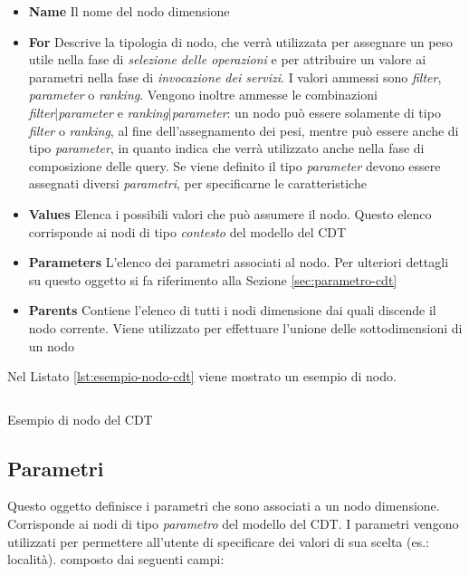 \begin{itemize}
	\item \textbf{Name} Il nome del nodo dimensione
	\item \textbf{For} Descrive la tipologia di nodo, che verrà utilizzata per assegnare un peso utile nella fase di \emph{selezione delle operazioni} e per attribuire un valore ai parametri nella fase di \emph{invocazione dei servizi}. I valori ammessi sono \emph{filter}, \emph{parameter} o \emph{ranking}. Vengono inoltre ammesse le combinazioni \emph{filter}|\emph{parameter} e \emph{ranking}|\emph{parameter}: un nodo può essere solamente di tipo \emph{filter} o \emph{ranking}, al fine dell'assegnamento dei pesi, mentre può essere anche di tipo \emph{parameter}, in quanto indica che verrà utilizzato anche nella fase di composizione delle query. Se viene definito il tipo \emph{parameter} devono essere assegnati diversi \emph{parametri}, per specificarne le caratteristiche
	\item \textbf{Values} Elenca i possibili valori che può assumere il nodo. Questo elenco corrisponde ai nodi di tipo \emph{contesto} del modello del CDT
	\item \textbf{Parameters} L'elenco dei parametri associati al nodo. Per ulteriori dettagli su questo oggetto si fa riferimento alla Sezione \ref{sec:parametro-cdt}
	\item \textbf{Parents} Contiene l'elenco di tutti i nodi dimensione dai quali discende il nodo corrente. Viene utilizzato per effettuare l'unione delle sottodimensioni di un nodo
\end{itemize}

Nel Listato \ref{lst:esempio-nodo-cdt} viene mostrato un esempio di nodo.
	
\begin{listing}[H]
	\inputminted{json}{5-implementazione-backend/Codice/esempio_nodo_cdt.json}
	\caption{Esempio di nodo del CDT}
	\label{lst:esempio-nodo-cdt}
\end{listing}

\subsection{Parametri\label{sec:parametro-cdt}}

Questo oggetto definisce i parametri che sono associati a un nodo dimensione. Corrisponde ai nodi di tipo \emph{parametro} del modello del CDT. I parametri vengono utilizzati per permettere all'utente di specificare dei valori di sua scelta (es.: località). \upe composto dai seguenti campi:

